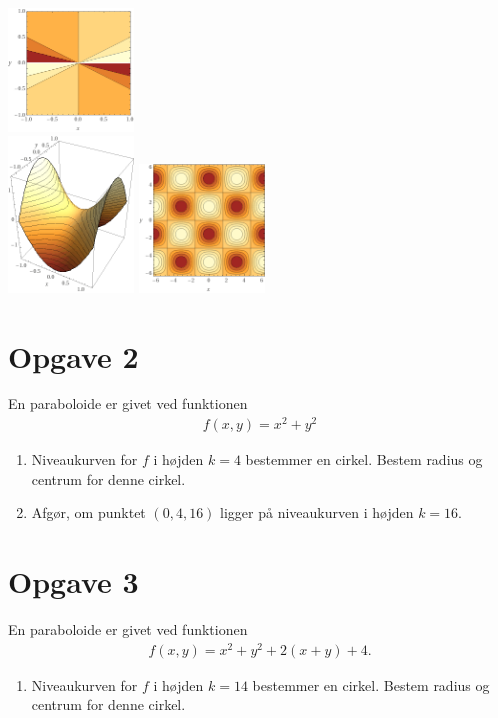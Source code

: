 \begin{center}
\includegraphics[width=0.25\textwidth]{Billeder/xdivyniveau.png}\\
\includegraphics[width=0.25\textwidth]{Billeder/hyperbel.png}
\includegraphics[width=0.25\textwidth]{Billeder/cossinniveau.png}\\
\end{center}


\section*{Opgave 2}
En paraboloide er givet ved funktionen 
\begin{align*}
	f(x,y) = x^2+y^2
\end{align*}
\begin{enumerate}[label=\roman*)]
	\item Niveaukurven for $f$ i højden $k = 4$ bestemmer en cirkel. Bestem radius og centrum for denne cirkel.
	\item Afgør, om punktet $(0,4,16)$ ligger på niveaukurven i højden $k=16$.
\end{enumerate}

\section*{Opgave 3}
En paraboloide er givet ved funktionen
\begin{align*}
	f(x,y) = x^2+y^2+2(x+y)+4.
\end{align*}
\begin{enumerate}[label=\roman*)]
	\item Niveaukurven for $f$ i højden $k=14$ bestemmer en cirkel. Bestem radius og centrum for denne cirkel. 	
\end{enumerate}

